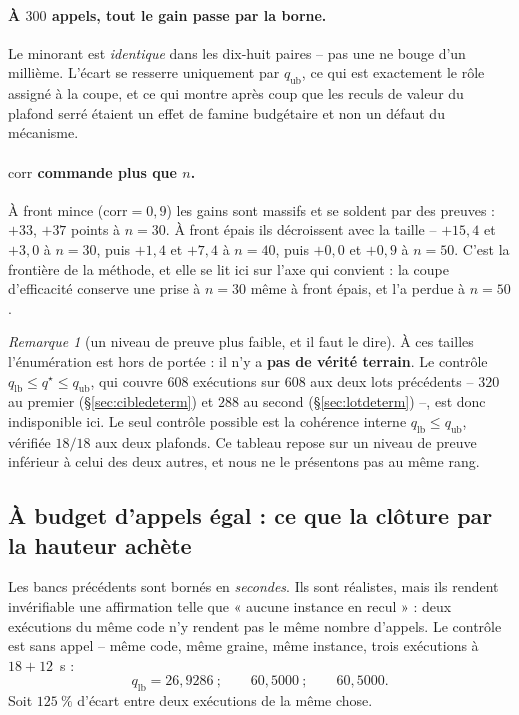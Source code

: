 \documentclass[11pt,a4paper]{article}
\theoremstyle{plain}
\theoremstyle{remark}
\newtheorem{remark}{Remarque}
\newcommand{\qs}{q^{\star}}
\begin{document}
\paragraph{À $300$ appels, tout le gain passe par la borne.} Le minorant est
\emph{identique} dans les dix-huit paires -- pas une ne bouge d'un
millième. L'écart se resserre uniquement par $q_{\text{ub}}$, ce qui est
exactement le rôle assigné à la coupe, et ce qui montre après coup que les
reculs de valeur du plafond serré étaient un effet de famine budgétaire et
non un défaut du mécanisme.

\paragraph{$\text{corr}$ commande plus que $n$.} À front mince
($\text{corr}=0{,}9$) les gains sont massifs et se soldent par des preuves :
$+33$, $+37$ points à $n=30$. À front épais ils décroissent avec la taille
-- $+15{,}4$ et $+3{,}0$ à $n=30$, puis $+1{,}4$ et $+7{,}4$ à $n=40$,
puis $+0{,}0$ et $+0{,}9$ à $n=50$. C'est la frontière de la méthode, et
elle se lit ici sur l'axe qui convient : la coupe d'efficacité conserve une
prise à $n=30$ même à front épais, et l'a perdue à $n=50$.

\begin{remark}[un niveau de preuve plus faible, et il faut le dire]
\label{rem:pasdevt}
À ces tailles l'énumération est hors de portée : il n'y a \textbf{pas de
vérité terrain}. Le contrôle $q_{\text{lb}}\le\qs\le q_{\text{ub}}$, qui
couvre $608$ exécutions sur $608$ aux deux lots précédents -- $320$ au
premier (§\ref{sec:cibledeterm}) et $288$ au second
(§\ref{sec:lotdeterm}) --, est donc indisponible ici.
Le seul contrôle possible est la cohérence interne
$q_{\text{lb}}\le q_{\text{ub}}$, vérifiée $18/18$ aux deux plafonds. Ce
tableau repose sur un niveau de preuve inférieur à celui des deux autres, et
nous ne le présentons pas au même rang.
\end{remark}

\subsection{À budget d'appels égal : ce que la clôture par la hauteur achète}
\label{sec:determ}

Les bancs précédents sont bornés en \emph{secondes}. Ils sont réalistes,
mais ils rendent invérifiable une affirmation telle que « aucune instance en
recul » : deux exécutions du même code n'y rendent pas le même nombre
d'appels. Le contrôle est sans appel -- même code, même graine, même
instance, trois exécutions à $18+12$~s :
\[
  q_{\text{lb}} = 26{,}9286\ ;\qquad 60{,}5000\ ;\qquad 60{,}5000 .
\]
Soit $125\ \%$ d'écart entre deux exécutions de la même chose.
\end{document}
